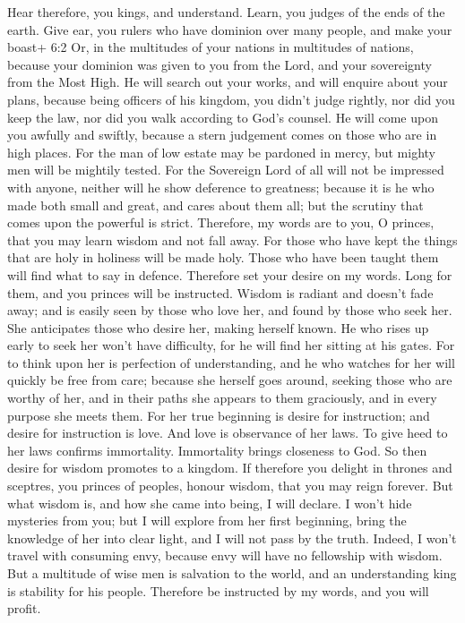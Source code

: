  Hear therefore, you kings, and understand. Learn, you
judges of the ends of the earth.  Give ear, you rulers who
have dominion over many people, and make your boast+ 6:2 Or, in the
multitudes of your nations in multitudes of nations, 
because your dominion was given to you from the Lord, and your
sovereignty from the Most High. He will search out your works, and will
enquire about your plans,  because being officers of his
kingdom, you didn't judge rightly, nor did you keep the law, nor did you
walk according to God's counsel.  He will come upon you
awfully and swiftly, because a stern judgement comes on those who are in
high places.  For the man of low estate may be pardoned in
mercy, but mighty men will be mightily tested.  For the
Sovereign Lord of all will not be impressed with anyone, neither will he
show deference to greatness; because it is he who made both small and
great, and cares about them all;  but the scrutiny that
comes upon the powerful is strict.  Therefore, my words are
to you, O princes, that you may learn wisdom and not fall away.
 For those who have kept the things that are holy in
holiness will be made holy. Those who have been taught them will find
what to say in defence.  Therefore set your desire on my
words. Long for them, and you princes will be instructed. 
Wisdom is radiant and doesn't fade away; and is easily seen by those who
love her, and found by those who seek her.  She anticipates
those who desire her, making herself known.  He who rises
up early to seek her won't have difficulty, for he will find her sitting
at his gates.  For to think upon her is perfection of
understanding, and he who watches for her will quickly be free from
care;  because she herself goes around, seeking those who
are worthy of her, and in their paths she appears to them graciously,
and in every purpose she meets them.  For her true
beginning is desire for instruction; and desire for instruction is love.
 And love is observance of her laws. To give heed to her
laws confirms immortality.  Immortality brings closeness to
God.  So then desire for wisdom promotes to a kingdom.
 If therefore you delight in thrones and sceptres, you
princes of peoples, honour wisdom, that you may reign forever.
 But what wisdom is, and how she came into being, I will
declare. I won't hide mysteries from you; but I will explore from her
first beginning, bring the knowledge of her into clear light, and I will
not pass by the truth.  Indeed, I won't travel with
consuming envy, because envy will have no fellowship with wisdom.
 But a multitude of wise men is salvation to the world, and
an understanding king is stability for his people. 
Therefore be instructed by my words, and you will profit.

